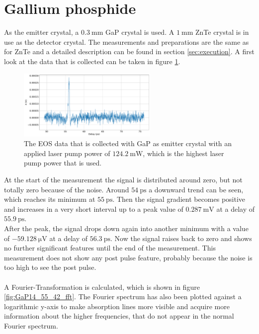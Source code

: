 \section{Gallium phosphide}
As the emitter crystal, a $\SI{0.3}{\milli\meter}$ GaP crystal is used.
A $\SI{1}{\milli\meter}$ ZnTe crystal is in use as the detector crystal.
The measurements and preparations are the same as for ZnTe and a detailed description can be found in section \ref{sec:execution}.
A first look at the data that is collected can be taken in figure \ref{fig:GaP14_55_42normalX}.
\\
\begin{figure}
    \centering
    \includegraphics[width=0.6\textwidth]{Plots/GaP14_55_42normalX.pdf}
    \caption{The EOS data that is collected with GaP as emitter crystal with an applied laser pump power of $\SI{124.2}{\milli\W}$, which is the highest laser pump power that is used.}
    \label{fig:GaP14_55_42normalX}
\end{figure}
At the start of the measurement the signal is distributed around zero, but not totally zero because of the noise.
Around $\SI{54}{\pico\second}$ a downward trend can be seen, which reaches its minimum at $\SI{55}{\pico\second}$.
Then the signal gradient becomes positive and increases in a very short interval up to a peak value of $\SI{0.287}{\milli\V}$ at a delay of $\SI{55.9}{\pico\second}$.
\\
After the peak, the signal drops down again into another minimum with a value of $\SI{-59.128}{\micro\V}$ at a delay of $\SI{56.3}{\pico\second}$.
Now the signal raises back to zero and shows no further significant features until the end of the measurement.
This measurement does not show any post pulse feature, probably because the noise is too high to see the post pulse.
\\\\
A Fourier-Transformation is calculated, which is shown in figure \ref{fig:GaP14_55_42_fft}.
The Fourier spectrum has also been plotted against a logarithmic y-axis to make absorption lines more visible and acquire more information about the higher frequencies, that do not appear in the normal Fourier spectrum.
